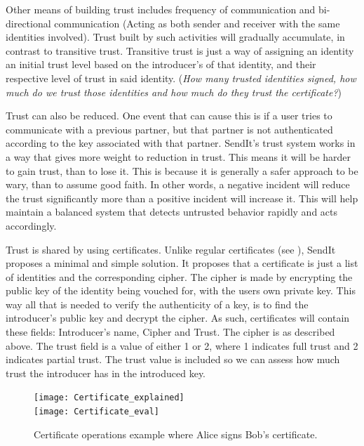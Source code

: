 		Other means of building trust includes frequency of communication and bi-directional communication (Acting as both sender and receiver with the same identities involved). Trust built by such activities will gradually accumulate, in contrast to transitive trust. Transitive trust is just a way of assigning an identity an initial trust level based on the introducer's of that identity, and their respective level of trust in said identity. (\emph{How many trusted identities signed, how much do we trust those identities and how much do they trust the certificate?})

		Trust can also be reduced. One event that can cause this is if a user tries to communicate with a previous partner, but that partner is not authenticated according to the key associated with that partner. SendIt's trust system works in a way that gives more weight to reduction in trust. This means it will be harder to gain trust, than to lose it. This is because it is generally a safer approach to be wary, than to assume good faith. In other words, a negative incident will reduce the trust significantly more than a positive incident will increase it. This will help maintain a balanced system that detects untrusted behavior rapidly and acts accordingly.

		Trust is shared by using certificates. Unlike regular certificates (see ), SendIt proposes a minimal and simple solution. It proposes that a certificate is just a list of identities and the corresponding cipher. The cipher is made by encrypting the public key of the identity being vouched for, with the users own private key. This way all that is needed to verify the authenticity of a key, is to find the introducer's public key and decrypt the cipher. As such, certificates will contain these fields: Introducer's name, Cipher and Trust. The cipher is as described above. The trust field is a value of either 1 or 2, where 1 indicates full trust and 2 indicates partial trust. The trust value is included so we can assess how much trust the introducer has in the introduced key.
		\begin{figure}
		  \centering
		  \texttt{[image: Certificate\_explained]}\\
		  \vspace{1cm}
		  \texttt{[image: Certificate\_eval]}
		  \centering
		  \decoRule
		  \caption[Certificate operations]{Certificate operations example where Alice signs Bob's certificate.}
		  \label{fig:cert_ex}
		\end{figure}

